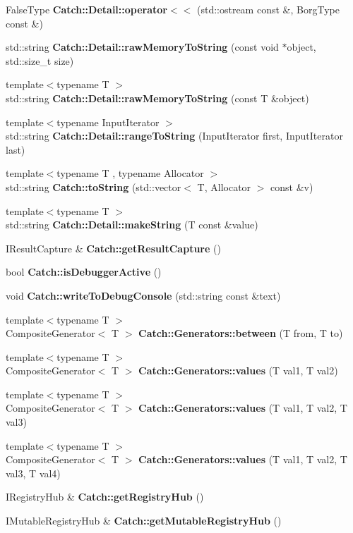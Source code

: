 \begin{DoxyCompactItemize}
False\+Type \textbf{ Catch\+::\+Detail\+::operator$<$$<$} (std\+::ostream const \&, Borg\+Type const \&)
\item 
std\+::string \textbf{ Catch\+::\+Detail\+::raw\+Memory\+To\+String} (const void $\ast$object, std\+::size\+\_\+t size)
\item 
{\footnotesize template$<$typename T $>$ }\\std\+::string \textbf{ Catch\+::\+Detail\+::raw\+Memory\+To\+String} (const T \&object)
\item 
{\footnotesize template$<$typename Input\+Iterator $>$ }\\std\+::string \textbf{ Catch\+::\+Detail\+::range\+To\+String} (Input\+Iterator first, Input\+Iterator last)
\item 
{\footnotesize template$<$typename T , typename Allocator $>$ }\\std\+::string \textbf{ Catch\+::to\+String} (std\+::vector$<$ T, Allocator $>$ const \&v)
\item 
{\footnotesize template$<$typename T $>$ }\\std\+::string \textbf{ Catch\+::\+Detail\+::make\+String} (T const \&value)
\item 
I\+Result\+Capture \& \textbf{ Catch\+::get\+Result\+Capture} ()
\item 
bool \textbf{ Catch\+::is\+Debugger\+Active} ()
\item 
void \textbf{ Catch\+::write\+To\+Debug\+Console} (std\+::string const \&text)
\item 
{\footnotesize template$<$typename T $>$ }\\Composite\+Generator$<$ T $>$ \textbf{ Catch\+::\+Generators\+::between} (T from, T to)
\item 
{\footnotesize template$<$typename T $>$ }\\Composite\+Generator$<$ T $>$ \textbf{ Catch\+::\+Generators\+::values} (T val1, T val2)
\item 
{\footnotesize template$<$typename T $>$ }\\Composite\+Generator$<$ T $>$ \textbf{ Catch\+::\+Generators\+::values} (T val1, T val2, T val3)
\item 
{\footnotesize template$<$typename T $>$ }\\Composite\+Generator$<$ T $>$ \textbf{ Catch\+::\+Generators\+::values} (T val1, T val2, T val3, T val4)
\item 
I\+Registry\+Hub \& \textbf{ Catch\+::get\+Registry\+Hub} ()
\item 
I\+Mutable\+Registry\+Hub \& \textbf{ Catch\+::get\+Mutable\+Registry\+Hub} ()

\end{DoxyCompactItemize}
